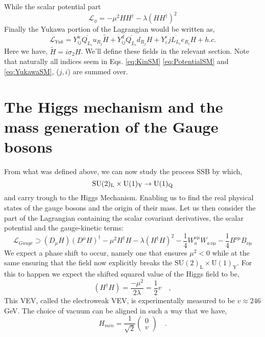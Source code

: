 %
While the scalar potential part 
%
\begin{equation}
\label{eq:PotentialSM}
\mathcal{L}_{\phi} = -\mu^2 H H^\dagger - \lambda (H H^\dagger)^2
\end{equation}
Finally the Yukawa portion of the Lagrangian would be written as, 
\begin{equation}
\label{eq:YukawaSM}
\mathcal{L}_{Yuk} = Y^u_{ij} \overline{Q_{L_i}} u_{R_j}  \tilde{H} + Y^d_{ij} \overline{Q_{L_i}}  d_{R_j} H  + Y^e_ij \overline{L_{L_i}}  e_{R_i} H + h.c. 
\end{equation}
%
Here we have, $\tilde{H}=i\sigma_2 H$.
%
%
We'll define these fields in the relevant section. Note that naturally all indices seem in Eqs. \ref{eq:KinSM} \ref{eq:PotentialSM} and \ref{eq:YukawaSM}, ($j,i$) are summed over. 


\renewcommand{\cleardoublepage}{}
\renewcommand{\clearpage}{}

\section{The Higgs mechanism and the mass generation of the Gauge bosons}

From what was defined above, we can now study the process SSB by which, 
%
\begin{equation}
\mathrm{SU}(2)_{\mathrm{L}}\times\mathrm{U}(1)_{\mathrm{Y}} \rightarrow \mathrm{U}(1)_{\mathrm{Q}}
\end{equation} 
%
and carry trough to the Higgs Mechanism. Enabling us to find the real physical states of the gauge bosons and the origin of their mass. Let us then consider the part of the Lagrangian containing the scalar covariant derivatives, the scalar potential and the gauge-kinetic terms:
%
\begin{equation}
\mathcal{L}_{Gauge} \supset (D_\mu H)(D^\mu H)^\dagger - \mu^2 H^\dagger H - \lambda (H^\dagger H)^2 - \frac{1}{4}  W^{\nu \mu}_a W_{a \,\nu \mu}  
- \frac{1}{4}  B^{\nu \mu} B_{\nu \mu}
\label{eq:GaugeSM}
\end{equation} 
% 
We expect a phase shift to occur, namely one that ensures $\mu^2 < 0$ while at the same ensuring that the field now explicitly breaks the $\mathrm{SU(2)_L \times U(1)_Y}$. For this to happen we expect the shifted squared value of the Higgs field to be,
%
\begin{equation}
(H^\dagger H) = \frac{-\mu^2}{2\lambda} = \frac{1}{2} v  \quad , 
\end{equation} 
This VEV, called the electroweak VEV, is experimentally measured to be $v \approx 246$ GeV. 
%
The choice of vacuum can be aligned in such a way that we have,
\begin{equation}
H_{min} = \frac{1}{\sqrt{2}} \begin{pmatrix} 0 \\
v 
\end{pmatrix} \quad .
\end{equation}

